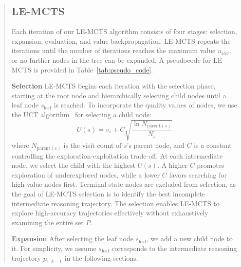 \documentclass[11pt]{article}
\begin{document}
\begin{abstract}
\subsection{LE-MCTS}
\label{text:method:lemcts}
Each iteration of our LE-MCTS algorithm consists of four stages: selection, expansion, evaluation, and value backpropagation. 
LE-MCTS repeats the iterations until the number of iterations reaches the maximum value \(n_{iter}\), or no further nodes in the tree can be expanded. 
A pseudocode for LE-MCTS is provided in Table~\ref{tab:pseudo_code}.
\medskip
\par \noindent \textbf{Selection} \;
LE-MCTS begins each iteration with the selection phase, starting at the root node and hierarchically selecting child nodes until a leaf node \( s_\text{leaf} \) is reached. To incorporate the quality values of nodes, we use the UCT algorithm~\citep{kocsis-etal-2006-uct} for selecting a child node:
\begin{equation}
    U(s) = v_s + C\sqrt{\frac{\ln N_{\text{parent}(s)}}{N_s}}
\end{equation}
where \( N_{\text{parent}(s)} \) is the visit count of \( s \)'s parent node, and \( C \) is a constant controlling the exploration-exploitation trade-off. 
At each intermediate node, we select the child with the highest \( U(s) \). 
A higher \( C \) promotes exploration of underexplored nodes, while a lower \( C \) favors searching for high-value nodes first. 
Terminal state nodes are excluded from selection, as the goal of LE-MCTS selection is to identify the best incomplete intermediate reasoning trajectory.
The selection enables LE-MCTS to explore high-accuracy trajectories effectively without exhaustively examining the entire set \( P \).
\medskip
\par \noindent \textbf{Expansion} \;
After selecting the leaf node \( s_{\text{leaf}} \), we add a new child node to it. 
For simplicity, we assume \( s_{\text{leaf}} \) corresponds to the intermediate reasoning trajectory \( p_{1:k-1} \) in the following sections.


\end{abstract}
\end{document}
